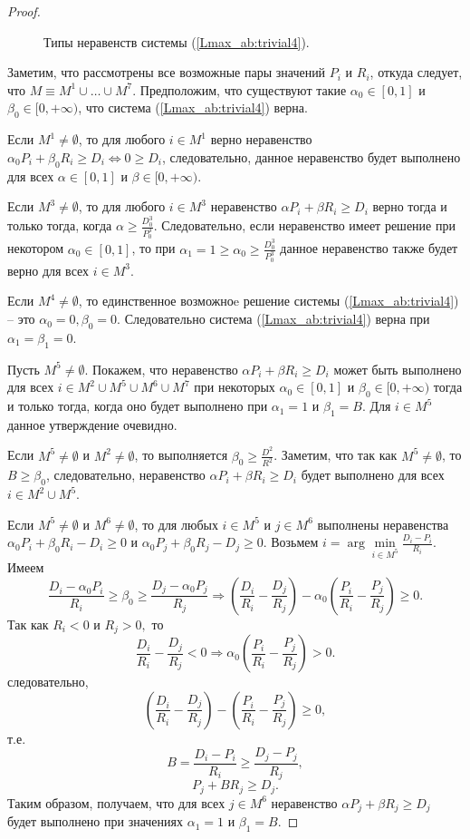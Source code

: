 \begin{proof}
\begin{figure}[h!]
\caption{Типы неравенств системы (\ref{Lmax_ab:trivial4}).}
\label{Lmax_ab:ris:5}
\end{figure}

Заметим, что рассмотрены все возможные пары значений $P_i$ и $R_i$, откуда следует, что $M \equiv M^1 \cup \dots \cup M^7$. Предположим, что существуют такие $\alpha_0 \in [0,1]$ и $\beta_0 \in [0, +\infty)$, что система (\ref{Lmax_ab:trivial4}) верна.

Если $M^1 \neq \emptyset$, то для любого $i \in M^1$ верно неравенство $\alpha_0 P_i + \beta_0 R_i \geq D_i \Leftrightarrow 0 \geq D_i$, следовательно, данное неравенство будет выполнено для всех $\alpha \in [0,1]$ и $\beta \in [0, +\infty)$.

Если $M^3 \neq \emptyset$, то для любого $i \in M^3$ неравенство $\alpha P_i + \beta R_i \geq D_i$ верно тогда и только тогда, когда $\alpha \geq \frac{D^3_0}{P^3_0}$. Следовательно, если неравенство имеет решение при некотором $\alpha_0 \in [0,1]$, то при $\alpha_1 = 1 \geq \alpha_0 \geq \frac{D^3_0}{P^3_0}$ данное неравенство также будет верно для всех $i \in M^3$.

Если $M^4 \neq \emptyset$, то единственное возможноe решение системы (\ref{Lmax_ab:trivial4}) -- это $\alpha_0 = 0, \beta_0 = 0.$ Следовательно система (\ref{Lmax_ab:trivial4}) верна при $\alpha_1 = \beta_1 = 0$.

Пусть $M^5 \neq \emptyset$. Покажем, что неравенство $\alpha P_i + \beta R_i \geq D_i$ может быть выполнено для всех $i \in M^2 \cup M^5 \cup M^6 \cup M^7$ при некоторых $\alpha_0 \in [0,1]$ и $\beta_0 \in  [0, +\infty)$ тогда и только тогда, когда оно будет выполнено при $\alpha_1 = 1$ и $\beta_1 = B$. Для $i \in M^5$ данное утверждение очевидно.

Если $M^5 \neq \emptyset$ и $M^2 \neq \emptyset$, то выполняется $\beta_0 \geq \frac{D^2}{R^2}$. Заметим, что так как $M^5 \neq \emptyset$, то $B \geq \beta_0$, следовательно, неравенство $\alpha P_i + \beta R_i \geq D_i$ будет выполнено для всех $i \in M^2 \cup M^5$.

Если $M^5 \neq \emptyset$ и $M^6 \neq \emptyset$, то для любых $i \in M^5$ и $j \in M^6$ выполнены неравенства $\alpha_0 P_i + \beta_0 R_i  - D_i \geq 0$ и $\alpha_0 P_j + \beta_0 R_j  - D_j \geq 0$. Возьмем $i = \arg \min\limits_{i \in M^5} \frac{D_i - P_i}{R_i}$. Имеем
$$\frac{D_i - \alpha_0 P_i}{R_i} \geq \beta_0 \geq \frac{D_j - \alpha_0 P_j}{R_j} \Rightarrow (\frac{D_i}{R_i} - \frac{D_j}{R_j}) - \alpha_0 (\frac{P_i}{R_i} - \frac{P_j}{R_j}) \geq 0.$$
Так как $R_i < 0$ и $R_j >0,$ то
$$\frac{D_i}{R_i} - \frac{D_j}{R_j} < 0 \Rightarrow \alpha_0 (\frac{P_i}{R_i} - \frac{P_j}{R_j}) > 0.$$
следовательно,
$$(\frac{D_i}{R_i} - \frac{D_j}{R_j}) - (\frac{P_i}{R_i} - \frac{P_j}{R_j}) \geq 0,$$
т.е.
$$B = \frac{D_i - P_i}{R_i} \geq \frac{D_j - P_j}{R_j},$$
$$P_j + B R_j \geq D_j.$$
Таким образом, получаем, что для всех $j \in M^6$ неравенство $\alpha P_j + \beta R_j \geq D_j$ будет выполнено при значениях $\alpha_1 = 1$ и $\beta_1 = B$.


\end{proof}
